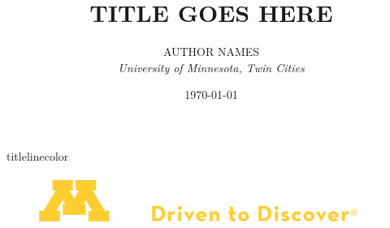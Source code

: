 \documentclass[xcolor=x11names,compress,aspectratio=169]{beamer}
\begin{document}
\title{\color{GopherDarkMaroon}TITLE GOES HERE}
\author{
  AUTHOR NAMES\\
  {\it University of Minnesota, Twin Cities}\\
}
\date{\today}

{%
  \begin{frame}[plain]
    \titlepage
    \begin{beamercolorbox}[wd=\paperwidth,ht=10.25ex,dp=2ex,center]{titlelinecolor}%
    \begin{figure}[h]
    \includegraphics[scale=0.7]{images/UMN_lgM-D2D-wdmk-gold-wh.png}
    \end{figure}
    \vspace{0.2cm}
  \end{beamercolorbox}
  \vspace{-0.95cm}
  \end{frame}
}
\addtocounter{framenumber}{-1}

\end{document}
